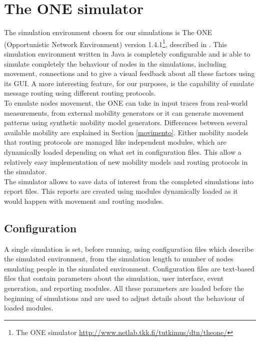 
\chapter{The ONE simulator}\label{simulatore} %



\graphicspath{{5-simulatore/img/}}


The simulation environment chosen for our simulations is The ONE (Opportunistic Network Environment) version 1.4.1\footnote{The ONE simulator \href{http://www.netlab.tkk.fi/tutkimus/dtn/theone/}{http://www.netlab.tkk.fi/tutkimus/dtn/theone/}}, described in \cite{articoloONE}. This simulation environment written in Java is completely configurable and is able to simulate completely the behaviour of nodes in the simulations, including movement, connections and to give a visual feedback about all these factors using its GUI. A more interesting feature, for our purposes, is the capability of emulate message routing using different routing protocols.
\\
 
To emulate nodes movement, the ONE can take in input traces from real-world measurements, from external mobility generators or it can generate movement patterns using synthetic mobility model generators. Differences between several available mobility are explained in Section \ref{movimento}. Either mobility models that routing protocols are managed like independent modules, which are dynamically loaded depending on what set in configuration files. This allow a relatively easy implementation of new mobility models and routing protocols in the simulator.
\\

The simulator allows to save data of interest from the completed simulations into report files. This reports are created using modules dynamically loaded as it would happen with movement and routing modules.
\\

\section{Configuration}
\label{configurazioneONE}
A single simulation is set, before running, using configuration files which describe the simulated environment, from the simulation length to number of nodes emulating people in the simulated environment. Configuration files are text-based files that contain parameters about the simulation, user interface, event generation, and reporting modules. All these parameters are loaded before the beginning of simulations and are used to adjust details about the behaviour of loaded modules.
\\

